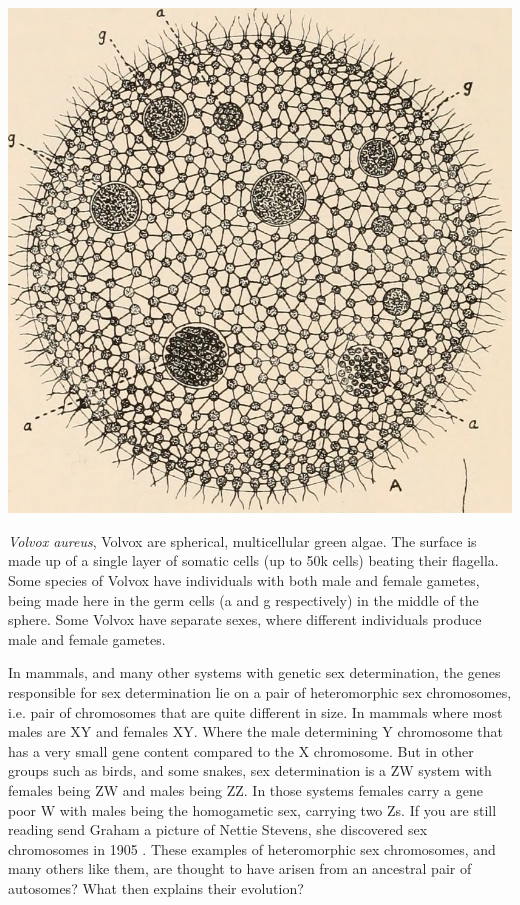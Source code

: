   \begin{marginfigure}[-6cm]
\begin{center}
\includegraphics[width = \textwidth]{illustration_images/multiple_sel_loci/volvox/volvox.jpg}
\end{center}
\caption{ {\it Volvox aureus}, Volvox are spherical, multicellular green algae. The surface is made up of a single layer of somatic cells (up to 50k cells) beating their flagella. Some species of Volvox have individuals with both male and female gametes, being made here in the germ cells (a and g respectively) in the middle of the sphere. Some Volvox have separate sexes, where different individuals produce male and female gametes.}
\end{marginfigure}
In mammals, and many other systems with genetic sex determination, the genes responsible for sex determination lie on a pair of heteromorphic sex chromosomes, i.e. pair of chromosomes that are quite different in size. In mammals where most males are XY and females XY. Where the male determining Y chromosome that has a very small gene content compared to the X chromosome. But in other groups such as birds, and some snakes, sex determination is a ZW system with females being ZW and males being ZZ. In those systems females carry a gene poor W with males being the homogametic sex, carrying two Zs.  If you are still reading send Graham a picture of Nettie Stevens, she discovered sex chromosomes in 1905 \citep{stevens1905studies}. These examples of heteromorphic sex chromosomes, and many others like them, are thought to have arisen from an ancestral pair of autosomes? What then explains their evolution? %

